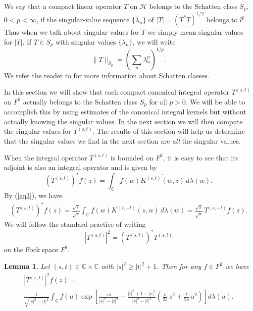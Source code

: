 \documentclass[reqno]{amsart}
\newtheorem{lemma}[theorem]{Lemma}
\newcommand{\C}{{\mathbb C}}
\newcommand{\inc}{\int_{\C}}
\begin{document}
We say that a compact linear operator $T$ on $\mathcal H$ belongs to the
Schatten class $S_p$, $0<p<\infty$, if the singular-value sequence
$\{\lambda_n\}$ of $|T|=(T^*T)^{1/2}$ belongs to $l^p$. Thus when we
talk about singular values for $T$ we simply mean singular values for $|T|$.
If $T\in S_p$ with singular values $\{\lambda_n\}$, we will write
$$\|T\|_{S_p}=\left(\sum_n\lambda_n^p\right)^{1/p}.$$
We refer the reader to \cite{Zhu2} for more information about
Schatten classes.

In this section we will show that each compact canonical integral operator
$T^{(s,t)}$ on $F^2$ actually belongs to the Schatten class $S_p$ for all 
$p>0$. We will be able to accomplish this by using estimates of the canonical
integral kernels but without actually knowing the singular values. In the
next section we will then compute the singular values for $T^{(s,t)}$.
The results of this section will help us determine that the singular values
we find in the next section are {\it all} the singular values.

When the integral operator $T^{(s,t)}$ is bounded on $F^2$, it is easy to 
see that its adjoint is also an integral operator and is given by
$$\left(T^{(s,t)}\right)^*f(z)=\inc f(w)\overline{K^{(s,t)}(w,z)}\,
d\lambda(w).$$
By (\ref{eq3}), we have
\begin{align}\label{eqTstar}
\left(T^{(s,t)}\right)^*f(z)=\frac{\sqrt{\overline{s}}}{\overline{\sqrt{s}}}
\inc f(w)K^{(\overline{s},-t)}(z,w)\,d\lambda(w)
=\frac{\sqrt{\overline{s}}}{\overline{\sqrt{s}}}\,T^{(\overline{s},-t)}f(z).
\end{align}
We will follow the standard practice of writing
$$\left|T^{(s,t)}\right|^2=\left(T^{(s,t)}\right)^*T^{(s,t)}$$
on the Fock space $F^2$.

\begin{lemma}\label{lemma|T|}
Let $(s, t)\in\C\times\C$ with $|s|^2\ge|t|^2+1$. Then for any
$f\in F^{2}$ we have
\begin{multline*}
\left|T^{(s,t)}\right|^2f(z)=\\
\frac{1}{\sqrt{|s|^2-|t|^2}}\inc f(u)\exp\left[\frac{ z\overline{u}}
{{|s|^2-|t|^2}}+\frac{|t|^2+1-|s|^2}{|s|^2-|t|^2}
\left(\frac{t}{2\overline{s}}\,z^2+\frac{\bar t}{2s}
\,\overline u^2\right)\right] d\lambda(u).
\end{multline*}
\end{lemma}
\end{document}
